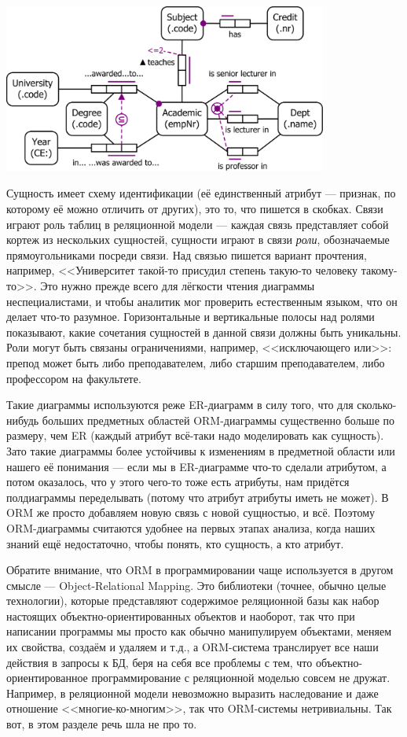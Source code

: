 \documentclass{../../text-style}
\begin{document}
\begin{center}
    \includegraphics[width=0.8\textwidth]{orm.png}
\end{center}

Сущность имеет схему идентификации (её единственный атрибут --- признак, по которому её можно отличить от других), это то, что пишется в скобках. Связи играют роль таблиц в реляционной модели --- каждая связь представляет собой кортеж из нескольких сущностей, сущности играют в связи \textit{роли}, обозначаемые прямоугольниками посреди связи. Над связью пишется вариант прочтения, например, <<Университет такой-то присудил степень такую-то человеку такому-то>>. Это нужно прежде всего для лёгкости чтения диаграммы неспециалистами, и чтобы аналитик мог проверить естественным языком, что он делает что-то разумное. Горизонтальные и вертикальные полосы над ролями показывают, какие сочетания сущностей в данной связи должны быть уникальны. Роли могут быть связаны ограничениями, например, <<исключающего или>>: препод может быть либо преподавателем, либо старшим преподавателем, либо профессором на факультете.

Такие диаграммы используются реже ER-диаграмм в силу того, что для сколько-нибудь больших предметных областей ORM-диаграммы существенно больше по размеру, чем ER (каждый атрибут всё-таки надо моделировать как сущность). Зато такие диаграммы более устойчивы к изменениям в предметной области или нашего её понимания --- если мы в ER-диаграмме что-то сделали атрибутом, а потом оказалось, что у этого чего-то тоже есть атрибуты, нам придётся полдиаграммы переделывать (потому что атрибут атрибуты иметь не может). В ORM же просто добавляем новую связь с новой сущностью, и всё. Поэтому ORM-диаграммы считаются удобнее на первых этапах анализа, когда наших знаний ещё недостаточно, чтобы понять, кто сущность, а кто атрибут.

Обратите внимание, что ORM в программировании чаще используется в другом смысле --- Object-Relational Mapping. Это библиотеки (точнее, обычно целые технологии), которые представляют содержимое реляционной базы как набор настоящих объектно-ориентированных объектов и наоборот, так что при написании программы мы просто как обычно манипулируем объектами, меняем их свойства, создаём и удаляем и т.д., а ORM-система транслирует все наши действия в запросы к БД, беря на себя все проблемы с тем, что объектно-ориентированное программирование с реляционной моделью совсем не дружат. Например, в реляционной модели невозможно выразить наследование и даже отношение <<многие-ко-многим>>, так что ORM-системы нетривиальны. Так вот, в этом разделе речь шла не про то.
\end{document}
